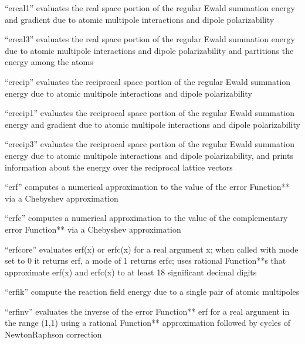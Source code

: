 \documentclass[letterpaper,11pt,english]{sphinxmanual}
\begin{document}

“ereal1” evaluates the real space portion of the regular Ewald summation energy and gradient due to atomic multipole interactions and dipole polarizability


“ereal3” evaluates the real space portion of the regular Ewald summation energy due to atomic multipole interactions and dipole polarizability and partitions the energy among the atoms


“erecip” evaluates the reciprocal space portion of the regular Ewald summation energy due to atomic multipole interactions and dipole polarizability


“erecip1” evaluates the reciprocal space portion of the regular Ewald summation energy and gradient due to atomic multipole interactions and dipole polarizability


“erecip3” evaluates the reciprocal space portion of the regular Ewald summation energy due to atomic multipole interactions and dipole polarizability, and prints information about the energy over the reciprocal lattice vectors


“erf” computes a numerical approximation to the value of the error Function** via a Chebyshev approximation


“erfc” computes a numerical approximation to the value of the complementary error Function** via a Chebyshev approximation


“erfcore” evaluates erf(x) or erfc(x) for a real argument x; when called with mode set to 0 it returns erf, a mode of 1 returns erfc; uses rational Function**s that approximate erf(x) and erfc(x) to at least 18 significant decimal digits


“erfik” compute the reaction field energy due to a single pair of atomic multipoles


“erfinv” evaluates the inverse of the error Function** erf for a real argument in the range (\sphinxhyphen{}1,1) using a rational Function** approximation followed by cycles of Newton\sphinxhyphen{}Raphson correction
\end{document}
